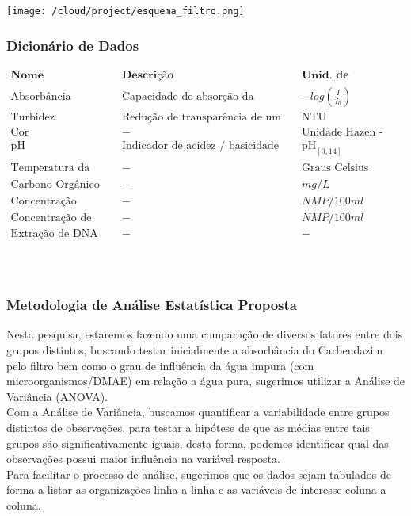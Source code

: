 \documentclass[
]{article}
\begin{document}
\texttt{[image: /cloud/project/esquema\_filtro.png]}

\hypertarget{dicionuxe1rio-de-dados}{%
\subsubsection{Dicionário de Dados}\label{dicionuxe1rio-de-dados}}

\[
\begin{array}{llllllllllllll}\hline
\textbf{Nome}&& \textbf{Descrição}&& \textbf{Unid. de Medida / Escala} &\\ \hline
\text{Absorbância Carbendazim}&& \text{Capacidade de absorção da substância em seu comprimento de onda} && -log(\frac{I}{I_0}) &\\
\text{Turbidez}&& \text{Redução de transparência de um meio líquido}&& \text{NTU} &\\
\text{Cor}&& -  && \text{Unidade Hazen - uH}   &\\
\text{pH}&& \text{Indicador de acidez / basicidade em uma solução} && \text{pH}_{[0,14]} &   \\
\text{Temperatura da Água}&& - && \text{Graus Celsius  (ºC)}  &    \\
\text{Carbono Orgânico Dissolvido} && - && mg/L   &    \\
\text{Concentração E.coli}&& - && NMP/100ml      &    \\
\text{Concentração de coliformes}&& - && NMP/100ml          &\\
\text{Extração de DNA}&&-&&-&\\
\end{array}
\]\\
~\\

\hypertarget{metodologia-de-anuxe1lise-estatuxedstica-proposta}{%
\subsubsection{Metodologia de Análise Estatística
Proposta}\label{metodologia-de-anuxe1lise-estatuxedstica-proposta}}

Nesta pesquisa, estaremos fazendo uma comparação de diversos fatores
entre dois grupos distintos, buscando testar inicialmente a absorbância
do Carbendazim pelo filtro bem como o grau de influência da água impura
(com microorganismos/DMAE) em relação a água pura, sugerimos utilizar a
Análise de Variância (ANOVA).\\
Com a Análise de Variância, buscamos quantificar a variabilidade entre
grupos distintos de observações, para testar a hipótese de que as médias
entre tais grupos são significativamente iguais, desta forma, podemos
identificar qual das observações possui maior influência na variável
resposta.\\
Para facilitar o processo de análise, sugerimos que os dados sejam
tabulados de forma a listar as organizações linha a linha e as variáveis
de interesse coluna a coluna.
\end{document}
